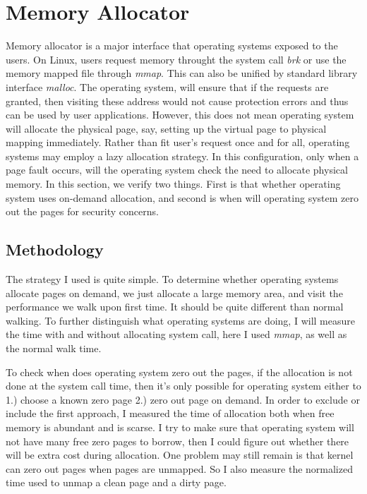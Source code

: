 \section{Memory Allocator}
	\label{sec:alloc}
Memory allocator is a major interface that operating systems exposed to the
users. On Linux, users request memory throught the system call \emph{brk} or
use the memory mapped file through \emph{mmap}. This can also be unified by
standard library interface \emph{malloc}.  The operating system, will ensure
that if the requests are granted, then visiting these address would not cause
protection errors and thus can be used by user applications. However, this does
not mean operating system will allocate the physical page, say, setting up the
virtual page to physical mapping immediately.  Rather than fit user's request
once and for all, operating systems may employ a lazy allocation strategy. In
this configuration, only when a page fault occurs, will the operating system
check the need to allocate physical memory. In this section, we verify two things.
First is that whether operating system uses on-demand allocation, and second
is when will operating system zero out the pages for security concerns.

\subsection{Methodology}
The strategy I used is quite simple. To determine whether operating systems
allocate pages on demand, we just allocate a large memory area, and visit the
performance we walk upon first time. It should be quite different than normal
walking. To further distinguish what operating systems are doing, I will measure
the time with and without allocating system call, here I used \emph{mmap}, as
well as the normal walk time.

To check when does operating system zero out the pages, if the allocation is
not done at the system call time, then it's only possible for operating system
either to 1.) choose a known zero page 2.) zero out page on demand. In order
to exclude or include the first approach, I measured the time of allocation
both when free memory is abundant and is scarse. I try to make sure that 
operating system will not have many free zero pages to borrow, then I could
figure out whether there will be extra cost during allocation. One problem may
still remain is that kernel can zero out pages when pages are unmapped. So I
also measure the normalized time used to unmap a clean page and a dirty page.

